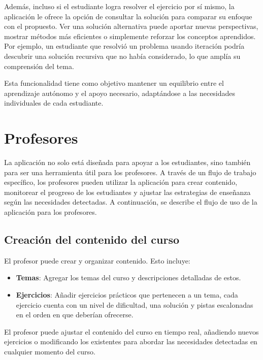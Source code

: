 \documentclass{article}
\begin{document}
Además, incluso si el estudiante logra resolver el ejercicio por sí mismo, la aplicación le ofrece la opción de consultar la solución para comparar su enfoque con el propuesto. Ver una solución alternativa puede aportar nuevas perspectivas, mostrar métodos más eficientes o simplemente reforzar los conceptos aprendidos. Por ejemplo, un estudiante que resolvió un problema usando iteración podría descubrir una solución recursiva que no había considerado, lo que amplía su comprensión del tema.

Esta funcionalidad tiene como objetivo mantener un equilibrio entre el aprendizaje autónomo y el apoyo necesario, adaptándose a las necesidades individuales de cada estudiante.

\section{Profesores}
La aplicación no solo está diseñada para apoyar a los estudiantes, sino también para ser una herramienta útil para los profesores. A través de un flujo de trabajo específico, los profesores pueden utilizar la aplicación para crear contenido, monitorear el progreso de los estudiantes y ajustar las estrategias de enseñanza según las necesidades detectadas. A continuación, se describe el flujo de uso de la aplicación para los profesores.

\subsection{Creación del contenido del curso}
El profesor puede crear y organizar contenido. Esto incluye:
\begin{itemize}
    \item \textbf{Temas}: Agregar los temas del curso y descripciones detalladas de estos.
    \item \textbf{Ejercicios}: Añadir ejercicios prácticos que pertenecen a un tema, cada ejercicio cuenta con un nivel de dificultad, una solución y pistas escalonadas en el orden en que deberían ofrecerse.
\end{itemize}

El profesor puede ajustar el contenido del curso en tiempo real, añadiendo nuevos ejercicios o modificando los existentes para abordar las necesidades detectadas en cualquier momento del curso.
\end{document}
